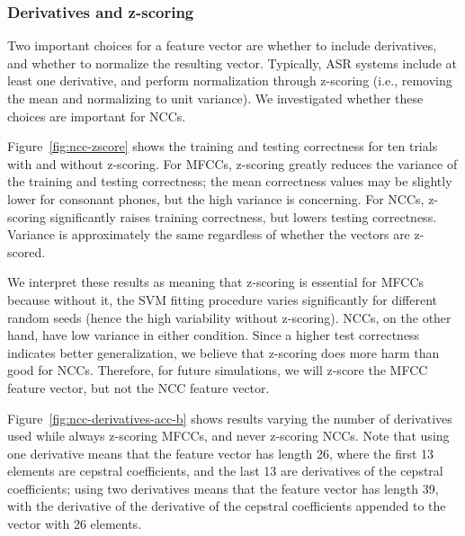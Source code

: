 \subsubsection{Derivatives and z-scoring}

Two important choices for a feature vector
are whether to include derivatives,
and whether to normalize the resulting vector.
Typically, ASR systems include at least
one derivative, and perform normalization
through z-scoring
(i.e., removing the mean
and normalizing to unit variance).
We investigated whether these
choices are important for NCCs.


Figure~\ref{fig:ncc-zscore} shows
the training and testing correctness
for ten trials
with and without z-scoring.
For MFCCs,
z-scoring greatly reduces the variance
of the training and testing correctness;
the mean correctness values
may be slightly lower
for consonant phones,
but the high variance is concerning.
For NCCs,
z-scoring significantly
raises training correctness,
but lowers testing correctness.
Variance is approximately the same
regardless of whether the vectors are z-scored.

We interpret these results
as meaning that z-scoring is essential
for MFCCs because without it,
the SVM fitting procedure
varies significantly for
different random seeds
(hence the high variability without z-scoring).
NCCs, on the other hand,
have low variance in either condition.
Since a higher test correctness indicates
better generalization,
we believe that z-scoring
does more harm than good for NCCs.
Therefore, for future simulations,
we will z-score the MFCC feature vector,
but not the NCC feature vector.


Figure~\ref{fig:ncc-derivatives-acc-b} shows
results varying the number of derivatives
used while always z-scoring MFCCs,
and never z-scoring NCCs.
Note that using one derivative means
that the feature vector has
length 26,
where the first 13 elements
are cepstral coefficients,
and the last 13 are derivatives
of the cepstral coefficients;
using two derivatives means that
the feature vector has length 39,
with the derivative of the
derivative of the cepstral coefficients
appended to the vector with 26 elements.

